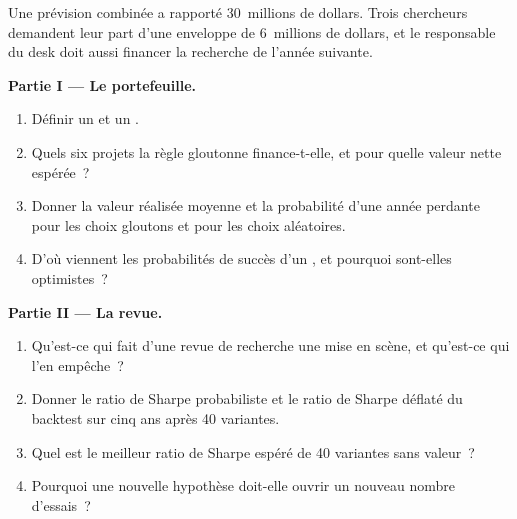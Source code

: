\begin{problem}\label{pb:fm:managing-researchers-traders-and-engineers:1}
Une prévision combinée a rapporté 30~millions de dollars. Trois chercheurs demandent leur part d'une enveloppe de 6~millions de dollars, et le responsable du desk doit aussi financer la recherche de l'année
suivante.

\medskip\noindent\textbf{Partie I --- Le portefeuille.}
\begin{enumerate}
\item Définir un  et un .
\item Quels six projets la règle gloutonne finance-t-elle, et pour quelle valeur nette espérée~?
\item Donner la valeur réalisée moyenne et la probabilité d'une année perdante pour les choix gloutons et pour les choix aléatoires.
\item D'où viennent les probabilités de succès d'un , et pourquoi sont-elles optimistes~?
\end{enumerate}

\medskip\noindent\textbf{Partie II --- La revue.}
\begin{enumerate}[resume]
\item Qu'est-ce qui fait d'une revue de recherche une mise en scène, et qu'est-ce qui l'en empêche~?
\item Donner le ratio de Sharpe probabiliste et le ratio de Sharpe déflaté du backtest sur cinq ans après 40 variantes.
\item Quel est le meilleur ratio de Sharpe espéré de 40 variantes sans valeur~?
\item Pourquoi une nouvelle hypothèse doit-elle ouvrir un nouveau nombre d'essais~?
\end{enumerate}


\end{problem}
